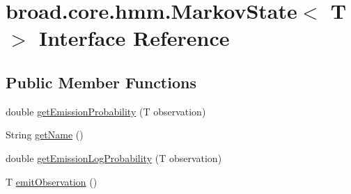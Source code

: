 \hypertarget{interfacebroad_1_1core_1_1hmm_1_1_markov_state_3_01_t_01_4}{\section{broad.\+core.\+hmm.\+Markov\+State$<$ T $>$ Interface Reference}
\label{interfacebroad_1_1core_1_1hmm_1_1_markov_state_3_01_t_01_4}
}
\subsection*{Public Member Functions}
\begin{DoxyCompactItemize}
\item 
double \hyperlink{interfacebroad_1_1core_1_1hmm_1_1_markov_state_3_01_t_01_4_ad3cd6d7c27695c97397797dacc59d089}{get\+Emission\+Probability} (T observation)
\item 
String \hyperlink{interfacebroad_1_1core_1_1hmm_1_1_markov_state_3_01_t_01_4_ad499d0d3db6b9cafaf6c4207e329df67}{get\+Name} ()
\item 
double \hyperlink{interfacebroad_1_1core_1_1hmm_1_1_markov_state_3_01_t_01_4_a88fafaa54e0b0ffec841b7a9c3def406}{get\+Emission\+Log\+Probability} (T observation)
\item 
T \hyperlink{interfacebroad_1_1core_1_1hmm_1_1_markov_state_3_01_t_01_4_a37ab2b37cad71e079dc27f665e6a4c70}{emit\+Observation} ()
\end{DoxyCompactItemize}


